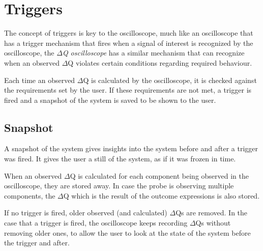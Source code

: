 \section{Triggers}
    The concept of triggers is key to the oscilloscope, much like an oscilloscope that has a trigger mechanism that fires when a signal of interest is recognized by the oscilloscope, the \textit{$\Delta$Q oscilloscope} has a similar mechanism that can recognize when an observed $\Delta$Q violates certain conditions regarding required behaviour.

    Each time an observed $\Delta$Q is calculated by the oscilloscope, it is checked against the requirements set by the user. If these requirements are not met, a trigger is fired and a snapshot of the system is saved to be shown to the user. 
    
    \subsection{Snapshot}
    A snapshot of the system gives insights into the system before and after a trigger was fired. It gives the user a still of the system, as if it was frozen in time.

When an observed $\Delta$Q is calculated for each component being observed in the oscilloscope, they are stored away. In case the probe is observing multiple components, the $\Delta$Q which is the result of the outcome expressions is also stored.

If no trigger is fired, older observed (and calculated) $\Delta$Qs are removed. In the case that a trigger is fired, the oscilloscope keeps recording $\Delta$Qs without removing older ones, to allow the user to look at the state of the system before the trigger and after.
    
